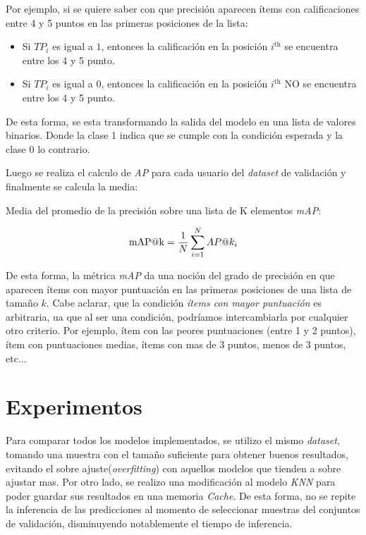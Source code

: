 \documentclass[11pt,a4paper,twoside]{thesis}
\begin{document}
Por ejemplo, si se quiere saber con que precisión aparecen ítems con
calificaciones entre 4 y 5 puntos en las primeras posiciones de la lista:

\begin{itemize}
	\item Si $TP_i$ es igual a $1$, entonces la calificación en la posición
	      $i^\mathrm{th}$ se encuentra entre los 4 y 5 punto.
	\item Si $TP_i$ es igual a $0$, entonces la calificación en la posición
	      $i^\mathrm{th}$ NO se encuentra entre los 4 y 5 punto.
\end{itemize}

De esta forma, se esta transformando la salida del modelo en una lista de
valores binarios. Donde la clase 1 indica que se cumple con la condición
esperada y la clase 0 lo contrario.

Luego se realiza el calculo de \textit{AP\makeatletter@k} para cada usuario del
\textit{dataset} de validación y finalmente se calcula la media:

\begin{description}
	\item[Media del promedio de la precisión sobre una lista de K elementos
	\textit{mAP\makeatletter@k}:]
\end{description}
\begin{equation}
	\operatorname{mAP\makeatletter@k}=\frac{1}{N} \sum_{i=1}^N AP\makeatletter@k_i
\end{equation}

De esta forma, la métrica \textit{mAP\makeatletter@k} da una noción del grado
de precisión en que aparecen ítems con mayor puntuación en las primeras
posiciones de una lista de tamaño $k$. Cabe aclarar, que la condición
\textit{ítems con mayor puntuación} es arbitraria, ua que al ser una condición,
podríamos intercambiarla por cualquier otro criterio. Por ejemplo, ítem con las
peores puntuaciones (entre 1 y 2 puntos), ítem con puntuaciones medias, ítems
con mas de 3 puntos, menos de 3 puntos, etc...

\chapter{Experimentos}

Para comparar todos los modelos implementados, se utilizo el mismo
\textit{dataset}, tomando una muestra con el tamaño suficiente para obtener
buenos resultados, evitando el sobre ajuste(\textit{overfitting}) con aquellos
modelos que tienden a sobre ajustar mas. Por otro lado, se realizo una
modificación al modelo \textit{KNN} para poder guardar sus resultados en una
memoria \textit{Cache}. De esta forma, no se repite la inferencia de las
predicciones al momento de seleccionar muestras del conjuntos de validación,
disminuyendo notablemente el tiempo de inferencia.
\end{document}
